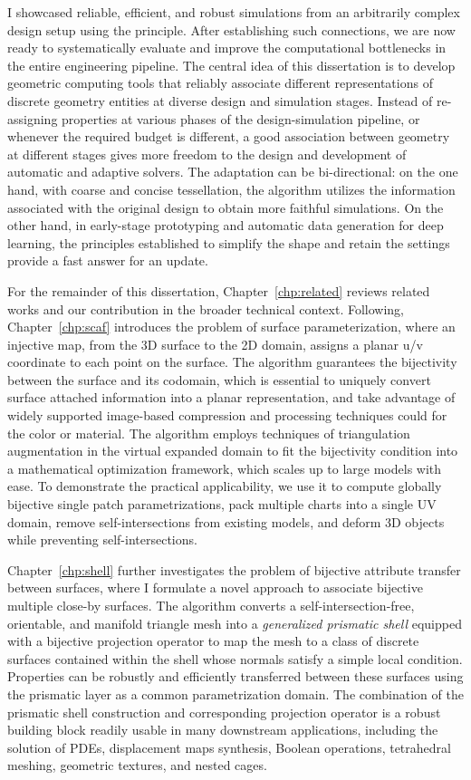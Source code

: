 I showcased reliable, efficient, and robust simulations from an arbitrarily complex design setup using the principle. After establishing such connections, we are now ready to systematically evaluate and improve the computational bottlenecks in the entire engineering pipeline.
The central idea of this dissertation is to develop geometric computing tools that reliably associate different representations of discrete geometry entities at diverse design and simulation stages. 
Instead of re-assigning properties at various phases of the design-simulation pipeline, or whenever the required budget is different, a good association between geometry at different stages gives more freedom to the design and development of automatic and adaptive solvers. The adaptation can be bi-directional: on the one hand, with coarse and concise tessellation, the algorithm utilizes the information associated with the original design to obtain more faithful simulations. On the other hand, in early-stage prototyping and automatic data generation for deep learning, the principles established to simplify the shape and retain the settings provide a fast answer for an update. 

For the remainder of this dissertation, Chapter~\ref*{chp:related} reviews related works and our contribution in the broader technical context. 
Following, Chapter~\ref*{chp:scaf} introduces the problem of surface parameterization, where an injective map, from the 3D surface to the 2D domain, assigns a planar u/v coordinate to each point on the surface. The algorithm guarantees the bijectivity between the surface and its codomain, which is essential to uniquely convert surface attached information into a planar representation, and take advantage of widely supported image-based compression and processing techniques could for the color or material. 
The algorithm employs techniques of triangulation augmentation in the virtual expanded domain to fit the bijectivity condition into a mathematical optimization framework, which scales up to large models with ease. 
To demonstrate the practical applicability, we use it to compute globally bijective single patch parametrizations, pack multiple charts into a single UV domain, remove self-intersections from existing models, and deform 3D objects while preventing self-intersections.

Chapter~\ref*{chp:shell} further investigates the problem of bijective attribute transfer between surfaces, where I formulate a novel approach to associate bijective multiple close-by surfaces. The algorithm converts a self-intersection-free, orientable, and manifold triangle mesh into a \emph{generalized prismatic shell} equipped with a bijective projection operator to map the mesh to a class of discrete surfaces contained within the shell whose normals satisfy a simple local condition. 
Properties can be robustly and efficiently transferred between these surfaces using the prismatic layer as a common parametrization domain. 
The combination of the prismatic shell construction and corresponding projection operator is a robust building block readily usable in many downstream applications, including the solution of PDEs, displacement maps synthesis, Boolean operations, tetrahedral meshing, geometric textures, and nested cages.

